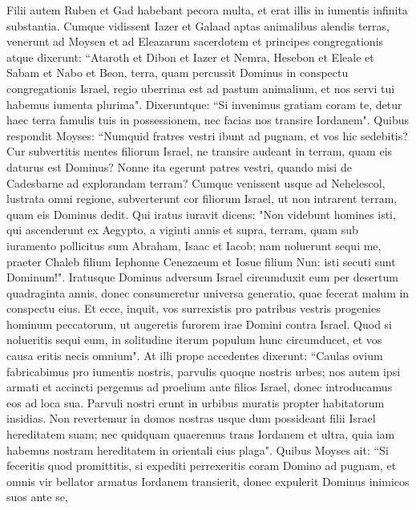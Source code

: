 \begin{biblechapter}  
\verse Filii autem Ruben et Gad habebant pecora multa, et erat illis in iumentis infinita substantia. Cumque vidissent Iazer et Galaad aptas animalibus alendis terras, 
\verse venerunt ad Moysen et ad Eleazarum sacerdotem et principes congregationis atque dixerunt: 
\verse “Ataroth et Dibon et Iazer et Nemra, Hesebon et Eleale et Sabam et Nabo et Beon, 
\verse terra, quam percussit Dominus in conspectu congregationis Israel, regio uberrima est ad pastum animalium, et nos servi tui habemus iumenta plurima". 
\verse Dixeruntque: “Si invenimus gratiam coram te, detur haec terra famulis tuis in possessionem, nec facias nos transire Iordanem". 
\verse Quibus respondit Moyses: “Numquid fratres vestri ibunt ad pugnam, et vos hic sedebitis? 
\verse Cur subvertitis mentes filiorum Israel, ne transire audeant in terram, quam eis daturus est Dominus? 
\verse Nonne ita egerunt patres vestri, quando misi de Cadesbarne ad explorandam terram? 
\verse Cumque venissent usque ad Nehelescol, lustrata omni regione, subverterunt cor filiorum Israel, ut non intrarent terram, quam eis Dominus dedit. 
\verse Qui iratus iuravit dicens:  
\verse "Non videbunt homines isti, qui ascenderunt ex Aegypto, a viginti annis et supra, terram, quam sub iuramento pollicitus sum Abraham, Isaac et Iacob; nam noluerunt sequi me, 
\verse praeter Chaleb filium Iephonne Cenezaeum et Iosue filium Nun: isti secuti sunt Dominum!". 
\verse Iratusque Dominus adversum Israel circumduxit eum per desertum quadraginta annis, donec consumeretur universa generatio, quae fecerat malum in conspectu eius. 
\verse Et ecce, inquit, vos surrexistis pro patribus vestris progenies hominum peccatorum, ut augeretis furorem irae Domini contra Israel. 
\verse Quod si nolueritis sequi eum, in solitudine iterum populum hunc circumducet, et vos causa eritis necis omnium". 
\verse At illi prope accedentes dixerunt: “Caulas ovium fabricabimus pro iumentis nostris, parvulis quoque nostris urbes; 
\verse nos autem ipsi armati et accincti pergemus ad proelium ante filios Israel, donec introducamus eos ad loca sua. Parvuli nostri erunt in urbibus muratis propter habitatorum insidias. 
\verse Non revertemur in domos nostras usque dum possideant filii Israel hereditatem suam; 
\verse nec quidquam quaeremus trans Iordanem et ultra, quia iam habemus nostram hereditatem in orientali eius plaga". 
\verse Quibus Moyses ait: “Si feceritis quod promittitis, si expediti perrexeritis coram Domino ad pugnam, 
\verse et omnis vir bellator armatus Iordanem transierit, donec expulerit Dominus inimicos suos ante se, 

\end{biblechapter}
